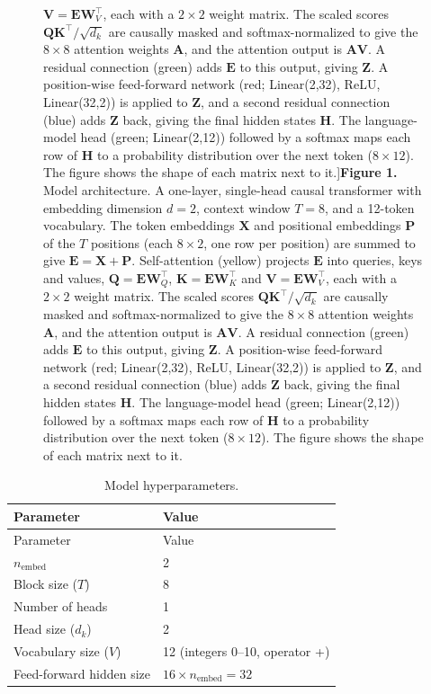 \documentclass[
  11pt,
  a4paper,
]{article}
\begin{document}
\begin{figure}
\(\mathbf{V} = \mathbf{E}\mathbf{W}_V^\top\), each with a \(2 \times 2\)
weight matrix. The scaled scores
\(\mathbf{Q}\mathbf{K}^\top/\sqrt{d_k}\) are causally masked and
softmax-normalized to give the \(8 \times 8\) attention weights
\(\mathbf{A}\), and the attention output is \(\mathbf{A}\mathbf{V}\). A
residual connection (green) adds \(\mathbf{E}\) to this output, giving
\(\mathbf{Z}\). A position-wise feed-forward network (red; Linear(2,32),
ReLU, Linear(32,2)) is applied to \(\mathbf{Z}\), and a second residual
connection (blue) adds \(\mathbf{Z}\) back, giving the final hidden
states \(\mathbf{H}\). The language-model head (green; Linear(2,12))
followed by a softmax maps each row of \(\mathbf{H}\) to a probability
distribution over the next token (\(8 \times 12\)). The figure shows the
shape of each matrix next to it.]{\textbf{Figure 1.} Model architecture.
A one-layer, single-head causal transformer with embedding dimension
\(d = 2\), context window \(T = 8\), and a 12-token vocabulary. The
token embeddings \(\mathbf{X}\) and positional embeddings \(\mathbf{P}\)
of the \(T\) positions (each \(8 \times 2\), one row per position) are
summed to give \(\mathbf{E} = \mathbf{X} + \mathbf{P}\). Self-attention
(yellow) projects \(\mathbf{E}\) into queries, keys and values,
\(\mathbf{Q} = \mathbf{E}\mathbf{W}_Q^\top\),
\(\mathbf{K} = \mathbf{E}\mathbf{W}_K^\top\) and
\(\mathbf{V} = \mathbf{E}\mathbf{W}_V^\top\), each with a \(2 \times 2\)
weight matrix. The scaled scores
\(\mathbf{Q}\mathbf{K}^\top/\sqrt{d_k}\) are causally masked and
softmax-normalized to give the \(8 \times 8\) attention weights
\(\mathbf{A}\), and the attention output is \(\mathbf{A}\mathbf{V}\). A
residual connection (green) adds \(\mathbf{E}\) to this output, giving
\(\mathbf{Z}\). A position-wise feed-forward network (red; Linear(2,32),
ReLU, Linear(32,2)) is applied to \(\mathbf{Z}\), and a second residual
connection (blue) adds \(\mathbf{Z}\) back, giving the final hidden
states \(\mathbf{H}\). The language-model head (green; Linear(2,12))
followed by a softmax maps each row of \(\mathbf{H}\) to a probability
distribution over the next token (\(8 \times 12\)). The figure shows the
shape of each matrix next to it.}
\end{figure}

\begin{longtable}[]{@{}ll@{}}
\caption{Model hyperparameters.}\label{tbl:hyperparams}\tabularnewline
\toprule\noalign{}
Parameter & Value \\
\midrule\noalign{}
\endfirsthead
\toprule\noalign{}
Parameter & Value \\
\midrule\noalign{}
\endhead
\bottomrule\noalign{}
\endlastfoot
\(n_{\mathrm{embed}}\) & 2 \\
Block size (\(T\)) & 8 \\
Number of heads & 1 \\
Head size (\(d_k\)) & 2 \\
Vocabulary size (\(V\)) & 12 (integers 0--10, operator +) \\
Feed-forward hidden size & \(16 \times n_{\mathrm{embed}} = 32\) \\
\end{longtable}
\end{document}

